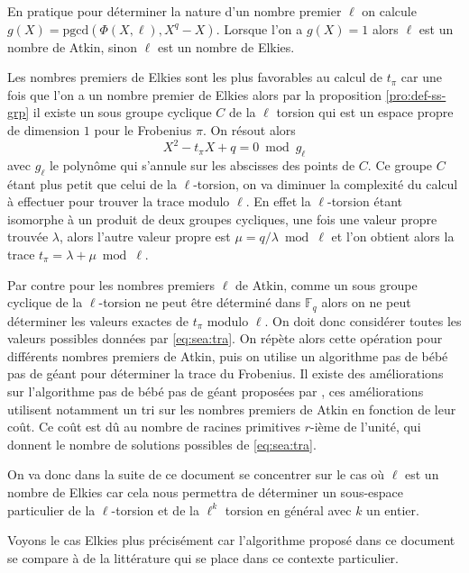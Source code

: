 \documentclass[10pt,a4paper]{book}
\theoremstyle{plain}
\theoremstyle{definition}
\theoremstyle{definition}
\theoremstyle{definition}
\theoremstyle{definition}
\theoremstyle{definition}
\theoremstyle{remark}
\theoremstyle{remark}
\theoremstyle{definition}
\begin{document}
En pratique pour déterminer la nature d'un nombre premier $\ell$ on calcule $g(X)=\mathrm{pgcd}(\Phi(X,\ell),X^q-X)$. Lorsque l'on a $g(X)=1$  alors $\ell$ est un nombre de Atkin, sinon $\ell$ est un nombre de Elkies.

Les nombres premiers de Elkies sont les plus favorables au calcul de $t_{\pi}$ car une fois que l'on a un nombre premier de Elkies alors par la proposition \ref{pro:def-ss-grp} il existe un sous groupe cyclique $C$ de la $\ell$ torsion qui est un espace propre de dimension $1$ pour le Frobenius $\pi$. On résout alors 
\begin{equation*}
X^2-t_{\pi}X+q = 0 \bmod g_{\ell}
\end{equation*} 
avec $g_{\ell}$ le polynôme qui s'annule sur les abscisses des points de $C$.
Ce groupe $C$ étant plus petit que celui de la $\ell$-torsion, on va diminuer la complexité du calcul à effectuer pour trouver la trace modulo $\ell$. En effet la $\ell$-torsion étant isomorphe à un produit de deux groupes cycliques, une fois une valeur propre trouvée $\lambda$, alors l'autre valeur propre est $\mu=q/\lambda \bmod \ell$ et l'on obtient alors la trace $t_{\pi}=\lambda+\mu \bmod \ell$. 

Par contre pour les nombres premiers $\ell$ de Atkin, comme un sous groupe 
cyclique de la $\ell$-torsion ne peut être déterminé dans $\mathbb{F}_q$ alors 
on ne peut déterminer les valeurs exactes de $t_{\pi}$ modulo $\ell$. On doit 
donc considérer toutes les valeurs possibles données par \eqref{eq:sea:tra}. On
répète alors cette opération pour  différents nombres premiers de Atkin, puis 
on utilise un algorithme pas de bébé pas de géant pour déterminer la trace du 
Frobenius. Il existe des améliorations sur l'algorithme pas de bébé pas de 
géant proposées par \cite{Ler97a}, ces améliorations utilisent notamment un tri
sur les nombres premiers de Atkin en fonction de leur coût. Ce coût est dû au 
nombre de racines primitives $r$-ième de l'unité, qui donnent le nombre de 
solutions possibles de \eqref{eq:sea:tra}.


On va donc dans la suite de ce document se concentrer sur le cas où $\ell$ est 
un nombre de Elkies car cela nous permettra de déterminer un sous-espace 
particulier de la $\ell$-torsion et de la $\ell^k$ torsion en général avec $k$ 
un entier.

Voyons le cas Elkies plus précisément car l'algorithme proposé dans ce document
se compare à de la littérature qui se place dans ce contexte particulier.
\end{document}
